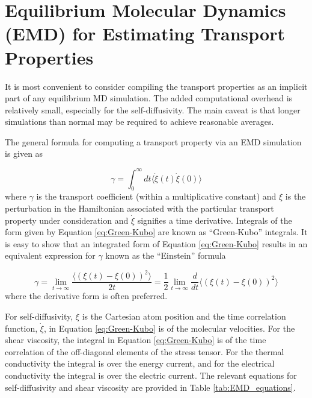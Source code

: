 \documentclass[9pt]{livecoms}
\begin{document}
\section{Equilibrium Molecular Dynamics (EMD) for Estimating Transport Properties}

It is most convenient to consider compiling the transport properties as an implicit part of any equilibrium MD simulation. The added computational overhead is relatively small, especially for the self-diffusivity. The main caveat is that longer simulations than normal may be required to achieve reasonable averages. 

The general formula for computing a transport property via an EMD simulation is given as

\begin{equation} \label{eq:Green-Kubo}
\gamma = \int_{0}^{\infty}dt\langle\dot{\xi}(t)\dot{\xi}(0)\rangle
\end{equation}
where $\gamma$ is the transport coefficient (within a multiplicative constant) and $\xi$ is the perturbation in the Hamiltonian associated with the particular transport property under consideration and $\dot{\xi}$ signifies a time derivative. Integrals of the form given by Equation \ref{eq:Green-Kubo} are known as “Green-Kubo” integrals. It is easy to show that an integrated form of Equation \ref{eq:Green-Kubo} results in an equivalent expression for $\gamma$ known as the “Einstein” formula

\begin{equation} \label{eq:Einstein}
\gamma = \lim_{t\to\infty} \frac{\langle (\xi(t)-\xi(0))^2 \rangle}{2t} = \frac{1}{2} \lim_{t\to\infty} \frac{d}{dt} \langle (\xi(t)-\xi(0))^2 \rangle
\end{equation}
where the derivative form is often preferred.

For self-diffusivity, $\xi$ is the Cartesian atom position and the time correlation function, $\dot{\xi}$, in Equation \ref{eq:Green-Kubo} is of the molecular velocities. For the shear viscosity, the integral in Equation \ref{eq:Green-Kubo} is of the time correlation of the off-diagonal elements of the stress tensor. For the thermal conductivity the integral is over the energy current, and for the electrical conductivity the integral is over the electric current. The relevant equations for self-diffusivity and shear viscosity are provided in Table \ref{tab:EMD_equations}.

\end{document}
